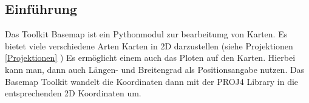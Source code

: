 \subsection{Einführung}
Das Toolkit Basemap ist ein Pythonmodul zur bearbeitumg von Karten.
Es bietet viele verschiedene Arten Karten in 2D darzustellen (siehe Projektionen \ref{Projektionen} )
Es ermöglicht einem auch das Ploten auf den Karten. Hierbei kann man, dann auch Längen- und Breitengrad
als Positionsangabe nutzen. Das Basemap Toolkit wandelt die Koordinaten dann mit der PROJ4 Library in 
die entsprechenden 2D Koordinaten um.